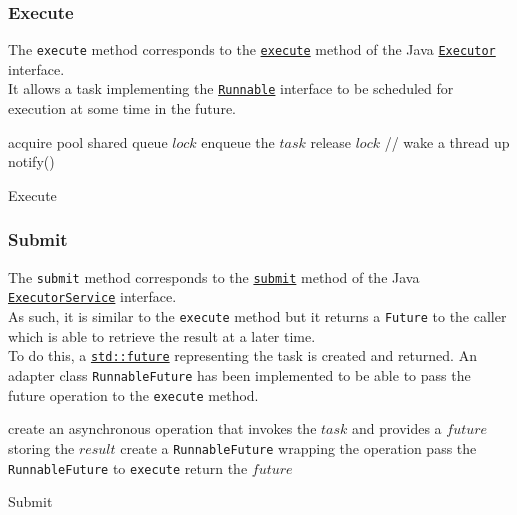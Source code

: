 \documentclass[10pt,twocolumn,letterpaper]{article}
\begin{document}
	\subsubsection{Execute}
	The \lstinline|execute| method corresponds to the  \href{https://docs.oracle.com/javase/7/docs/api/java/util/concurrent/Executor.html#execute(java.lang.Runnable)}{\lstinline{execute}} method of the Java  \href{https://docs.oracle.com/javase/7/docs/api/java/util/concurrent/Executor.html}{\lstinline{Executor}} interface.\\
	It allows a task implementing the \hyperref[sec:runnable]{\lstinline|Runnable|} interface to be scheduled for execution at some time in the future.
	\begin{algorithm}
		\SetAlgoLined
		acquire pool shared queue $lock$\;
		enqueue the $task$\;
		release $lock$\;
		// wake a thread up\\
		notify()\;
		\caption{Execute}
		\label{pseudo:execute}
	\end{algorithm}
	\subsubsection{Submit}
	The \lstinline|submit| method corresponds to the  \href{https://docs.oracle.com/javase/7/docs/api/java/util/concurrent/ExecutorService.html#submit(java.lang.Runnable,\%20T)}{\lstinline{submit}} method of the Java  \href{https://docs.oracle.com/javase/7/docs/api/java/util/concurrent/ExecutorService.html}{\lstinline{ExecutorService}} interface.\\
	As such, it is similar to the \lstinline|execute| method but it returns a \lstinline|Future| to the caller which is able to retrieve the result at a later time.\\
	To do this, a \href{https://en.cppreference.com/w/cpp/thread/future}{\lstinline|std::future|} representing the task is created and returned.
	An adapter class \lstinline|RunnableFuture| has been implemented to be able to pass the future operation to the \lstinline|execute| method.
	\begin{algorithm}
		\SetAlgoLined
		\KwData{$task$, $result$}
		create an asynchronous operation that invokes the $task$ and provides a $future$ storing the $result$\;
		create a \lstinline|RunnableFuture| wrapping the operation\;
		pass the \lstinline|RunnableFuture| to \lstinline|execute|\;
		return the $future$\;
		\caption{Submit}
		\label{pseudo:execute}
	\end{algorithm}
	
\end{document}
